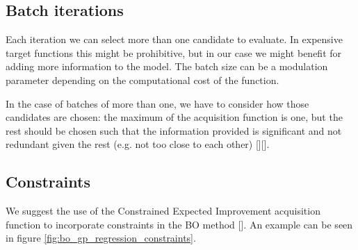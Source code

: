 \subsection{Batch iterations}
Each iteration we can select more than one candidate to evaluate. In expensive target functions this might be prohibitive, but in our case we might benefit for adding more information to the model. The batch size can be a modulation parameter depending on the computational cost of the function.

In the case of batches of more than one, we have to consider how those candidates are chosen: the maximum of the acquisition function is one, but the rest should be chosen such that the information provided is significant and not redundant given the rest (e.g. not too close to each other) [\cite{nguyen_budgeted_2017}][\cite{gonzalez_batch_nodate}].

\subsection{Constraints}

We suggest the use of the Constrained Expected Improvement acquisition function to incorporate constraints in the BO method [\cite{gardner_bayesian_nodate}]. An example can be seen in figure \ref{fig:bo_gp_regression_constraints}.

